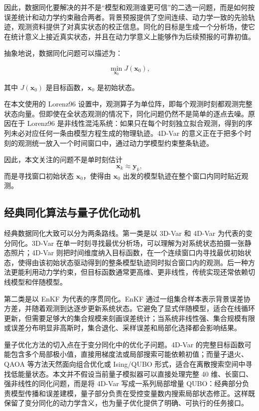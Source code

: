 \documentclass[UTF8,a4paper,12pt]{ctexart}
\begin{document}
因此，数据同化要解决的并不是“模型和观测谁更可信”的二选一问题，而是如何按误差统计和动力学约束融合两者。背景预报提供了空间连续、动力学一致的先验轨迹，观测资料提供了对真实状态的校正信息。同化的目标是生成一个分析场，使它在统计意义上接近真实状态，并且在动力学意义上能够作为后续预报的可靠初值。

抽象地说，数据同化问题可以描述为：

\begin{equation}
  \min_{\bm{x}_0} J(\bm{x}_0),
\end{equation}

其中 $J(\bm{x}_0)$ 是目标函数，$\bm{x}_0$ 是初始状态。

在本文使用的 Lorenz96 设置中，观测算子为单位阵，即每个观测时刻都观测完整状态向量。但即使在全状态观测的情况下，同化问题仍然不是简单的逐点去噪。原因在于 Lorenz96 是非线性混沌系统：如果只在每个时刻独立拟合观测，得到的序列未必对应任何一条由模型方程生成的物理轨迹。4D-Var 的意义正在于把多个时刻的观测统一放入一个时间窗口中，通过动力学模型约束整条轨迹。

因此，本文关注的问题不是单时刻估计
\begin{equation}
  \bm{x}_k \approx \bm{y}_k,
\end{equation}
而是寻找窗口初始状态 $\bm{x}_0$，使得由 $\bm{x}_0$ 出发的模型轨迹在整个窗口内同时贴近观测。

\subsection{经典同化算法与量子优化动机}

经典数据同化大致可以分为两条路线。第一类是以 3D-Var 和 4D-Var 为代表的变分同化。3D-Var 在单一时刻寻找最优分析场，可以理解为对系统状态拍摄一张静态照片；4D-Var 则把时间维度纳入目标函数，在一个连续窗口内寻找最优初始状态，使得由该初始状态驱动得到的整条模型轨迹同时拟合窗口内的观测。后一种方法更能利用动力学约束，但目标函数通常更高维、更非线性，传统实现还常依赖切线模型和伴随模型。

第二类是以 EnKF 为代表的序贯同化。EnKF 通过一组集合样本表示背景误差协方差，并随着观测到达逐步更新系统状态。它避免了显式伴随模型，适合在线循环更新，但需要足够大的集合规模来刻画误差统计；当系统非线性强、集合规模有限或误差分布明显非高斯时，集合退化、采样误差和局部化选择都会影响结果。

量子优化方法的切入点在于变分同化中的优化子问题。4D-Var 的完整目标函数可能包含多个局部极小值，直接用梯度法或局部搜索可能依赖初值；而量子退火、QAOA 等方法天然面向组合优化或 Ising/QUBO 形式，适合在离散搜索空间中寻找低能量状态。本文并不假设当前量子模拟器可以直接处理完整 40 维、长窗口、强非线性的同化问题，而是将 4D-Var 写成一系列局部增量 QUBO：经典部分负责模型传播和误差建模，量子部分负责在受控变量数内搜索局部状态修正。这样既保留了变分同化的动力学含义，也为量子优化提供了明确、可执行的任务接口。
\end{document}
